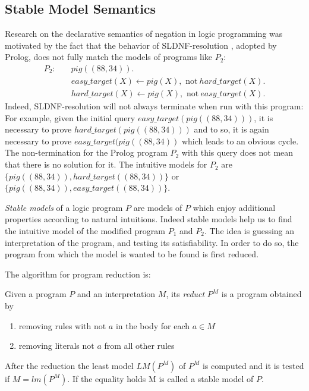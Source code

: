 \subsection{Stable Model Semantics}
Research on the declarative semantics of negation in logic programming was motivated by the fact that the behavior of SLDNF-resolution \cite{}, adopted by Prolog,  does not fully match the models of programs like \(P_2\):
\begin{align}
  P_2 \colon \quad
&\mathit{pig}((88,34)). \\
&\mathit{easy\_target}(X) \leftarrow pig(X), \text{ not}\: \mathit{hard\_target}(X). \label{eq:3}\\ 
&\mathit{hard\_target}(X) \leftarrow pig(X), \text{ not}\: \mathit{easy\_target}(X). \label{eq:4}
\end{align}
Indeed, SLDNF-resolution will not always terminate when run with this program: For example, given the initial query \(\mathit{easy\_target}(pig((88,34)))\), it is necessary to prove \(\mathit{hard\_target}(pig((88,34)))\) and to so, it is again necessary to prove \(\mathit{easy\_target}(pig((88,34))\) which leads to an obvious cycle.
The non-termination for the Prolog program \(P_2\) with this query does not mean that there is no solution for it. The intuitive models for \(P_2\) are \(\{pig((88,34)), \mathit{hard\_target}((88,34))\}\) or \(\{pig((88,34)), \mathit{easy\_target}((88,34))\}\).

\emph{Stable models} of a logic program \(P\) are models of \(P\) which enjoy additional properties according to natural intuitions.
Indeed stable models help us to find the intuitive model of the modified program \(P_1\) and \(P_2\). The idea is guessing an interpretation of the program, and testing its satisfiability. In order to do so, the program from which the model is wanted to be found is first reduced. 

The algorithm for program reduction is:

Given a program \(P\) and an interpretation \(M\), its \emph{reduct} \(P^M\) is a program obtained by 
\begin{enumerate} 
\item removing rules with \(\text{not } a\) in the body for each \(a \in M\)
\item removing literals \(\text{not } a\) from all other rules %
\end{enumerate}
After the reduction the least model \(LM(P^M)\) of \(P^M\) is computed and it is tested if \(M = lm(P^M)\). If the equality holds M is called a stable model of \(P\).

